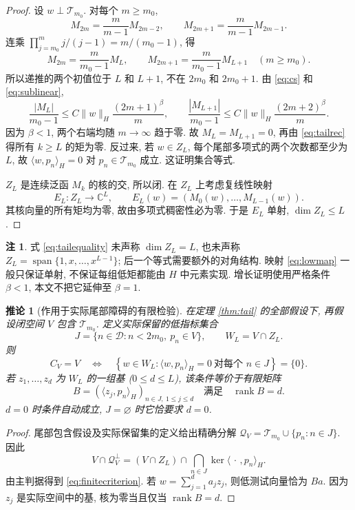 \documentclass[UTF8,11pt]{ctexart}
\newtheorem{corollary}[theorem]{推论}
\theoremstyle{definition}
\newtheorem{remark}[theorem]{注}
\DeclareMathOperator{\Span}{span}
\DeclareMathOperator{\rank}{rank}
\newcommand{\ip}[2]{\langle #1,#2\rangle_H}
\newcommand{\D}{\mathcal D}
\newcommand{\Q}{\mathcal Q}
\begin{document}
\begin{proof}
设 $w\perp\mathcal T_{m_0}$. 对每个 $m\geq m_0$,
\[
 M_{2m}=\frac{m}{m-1}M_{2m-2},\qquad
 M_{2m+1}=\frac{m}{m-1}M_{2m-1}.
\]
连乘 $\prod_{j=m_0}^m j/(j-1)=m/(m_0-1)$, 得
\begin{equation}\label{eq:tailrec}
 M_{2m}=\frac{m}{m_0-1}M_L,\qquad
 M_{2m+1}=\frac{m}{m_0-1}M_{L+1}\quad(m\geq m_0).
\end{equation}
所以递推的两个初值位于 $L$ 和 $L+1$, 不在 $2m_0$ 和 $2m_0+1$.
由 \eqref{eq:cs} 和 \eqref{eq:sublinear},
\[
 \frac{|M_L|}{m_0-1}\leq C\|w\|_H\frac{(2m+1)^\beta}{m},\qquad
 \frac{|M_{L+1}|}{m_0-1}\leq C\|w\|_H\frac{(2m+2)^\beta}{m}.
\]
因为 $\beta<1$, 两个右端均随 $m\to\infty$ 趋于零.
故 $M_L=M_{L+1}=0$, 再由 \eqref{eq:tailrec} 得所有 $k\geq L$ 的矩为零.
反过来, 若 $w\in Z_L$, 每个尾部多项式的两个次数都至少为 $L$,
故 $\ip{w}{p_n}=0$ 对 $p_n\in\mathcal T_{m_0}$ 成立.
这证明集合等式.

$Z_L$ 是连续泛函 $M_k$ 的核的交, 所以闭.
在 $Z_L$ 上考虑复线性映射
\begin{equation}\label{eq:lowmap}
 E_L:Z_L\longrightarrow\mathbb C^L,\qquad
 E_L(w)=(M_0(w),\ldots,M_{L-1}(w)).
\end{equation}
其核向量的所有矩均为零, 故由多项式稠密性必为零.
于是 $E_L$ 单射, $\dim Z_L\leq L$.
\end{proof}

\begin{remark}
式 \eqref{eq:tailequality} 未声称 $\dim Z_L=L$, 也未声称
$Z_L=\Span\{1,x,\ldots,x^{L-1}\}$; 后一个等式需要额外的对角结构.
映射 \eqref{eq:lowmap} 一般只保证单射, 不保证每组低矩都能由 $H$ 中元素实现.
增长证明使用严格条件 $\beta<1$, 本文不把它延伸至 $\beta=1$.
\end{remark}

\begin{corollary}[作用于实际尾部障碍的有限检验]\label{cor:finite}
在定理 \ref{thm:tail} 的全部假设下, 再假设闭空间 $V$ 包含
$\mathcal T_{m_0}$. 定义\emph{实际保留}的低指标集合
\[
 J=\{n\in\D:n<2m_0,\ p_n\in V\},\qquad W_L=V\cap Z_L.
\]
则
\begin{equation}\label{eq:finitecriterion}
 C_V=V\quad\Longleftrightarrow\quad
 \left\{w\in W_L:\ip{w}{p_n}=0\ \text{对每个 }n\in J\right\}=\{0\}.
\end{equation}
若 $z_1,\ldots,z_d$ 为 $W_L$ 的一组基 ($0\leq d\leq L$),
该条件等价于有限矩阵
\begin{equation}\label{eq:finitematrix}
 B=(\ip{z_j}{p_n})_{n\in J,\ 1\leq j\leq d}
 \quad\text{满足}\quad\rank B=d.
\end{equation}
$d=0$ 时条件自动成立, $J=\varnothing$ 时它恰要求 $d=0$.
\end{corollary}
\begin{proof}
尾部包含假设及实际保留集的定义给出精确分解
$\Q_V=\mathcal T_{m_0}\cup\{p_n:n\in J\}$.
因此
\[
 V\cap\Q_V^\perp=(V\cap Z_L)\cap\bigcap_{n\in J}\ker\ip{\,\cdot\,}{p_n}.
\]
由主判据得到 \eqref{eq:finitecriterion}.
若 $w=\sum_{j=1}^d a_jz_j$, 则低测试向量恰为 $Ba$.
因为 $z_j$ 是实际空间中的基, 核为零当且仅当 $\rank B=d$.
\end{proof}
\end{document}
